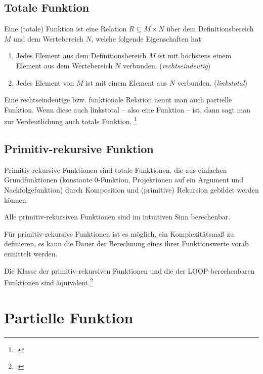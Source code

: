 \documentclass{bschlangaul-theorie}
\begin{document}
\subsection{Totale Funktion}

Eine (totale) Funktion ist eine Relation $R \subseteq M \times N$ über
dem Deﬁnitionsbereich $M$ und dem Wertebereich $N$, welche folgende
Eigenschaften hat:

\begin{enumerate}
\item Jedes Element aus dem Deﬁnitionsbereich $M$ ist mit höchstens
einem Element aus dem Wertebereich $N$ verbunden. (\emph{rechtseindeutig})

\item Jedes Element von $M$ ist mit einem Element aus $N$ verbunden.
(\emph{linkstotal})
\end{enumerate}

\begin{liExkurs}
Eine rechtseindeutige bzw. funktionale Relation nennt man auch partielle
Funktion. Wenn diese auch linkstotal – also eine Funktion – ist, dann
sagt man zur Verdeutlichung auch totale Funktion.
\footcite{wiki:relation}
\end{liExkurs}

\subsection{Primitiv-rekursive Funktion}

Primitiv-rekursive Funktionen sind totale Funktionen, die aus einfachen
Grundfunktionen (konstante 0-Funktion, Projektionen auf ein Argument und
Nachfolgefunktion) durch Komposition und (primitive) Rekursion gebildet
werden können.

Alle primitiv-rekursiven Funktionen sind im intuitiven Sinn berechenbar.

Für primitiv-rekursive Funktionen ist es möglich, ein Komplexitätsmaß zu
definieren, \dh es kann die Dauer der Berechnung eines ihrer
Funktionswerte vorab ermittelt werden.

Die Klasse der primitiv-rekursiven Funktionen und die der
LOOP-berechenbaren Funktionen sind äquivalent.\footcite{wiki:primitiv-rekursive-funktion}

\section{Partielle Funktion}
\end{document}
